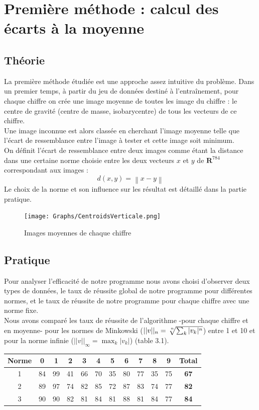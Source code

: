 \documentclass[a4paper,11pt,twoside]{report}
\newcommand{\norm}[1]{\left\lVert#1\right\rVert} %
\begin{document}
\chapter{Première méthode : calcul des écarts à la moyenne} 
\section{Théorie}
La première méthode étudiée est une approche assez intuitive du problème.
Dans un premier temps, à partir du jeu de données destiné à l'entraînement, pour chaque chiffre on crée une image moyenne de toutes les image du chiffre : le centre de gravité (centre de masse, isobarycentre) de tous les vecteurs de ce chiffre.\\Une image inconnue est alors classée en cherchant l'image moyenne telle que l'écart de ressemblance entre l'image à tester et cette image soit minimum.\\

On définit l'écart de ressemblance entre deux images comme étant la distance dans une certaine norme choisie entre les deux vecteurs $x$ et $y$ de $\textbf{R}^{784}$ correspondant aux images : $$d(x,y) = \norm{x-y}$$ Le choix de la norme et son influence sur les résultat est détaillé dans la partie pratique.

\begin{figure}[H]
  	\texttt{[image: Graphs/CentroidsVerticale.png]}
  	\caption{Images moyennes de chaque chiffre}
\end{figure}

\section{Pratique}
Pour analyser l'efficacité de notre programme nous avons choisi d'observer deux types de données, le taux de réussite global de notre programme pour différentes normes, et le taux de réussite de notre programme pour chaque chiffre avec une norme fixe.
\\
Nous avons comparé les taux de réussite de l'algorithme -pour chaque chiffre et en moyenne- pour les normes de Minkowski ($||v||_{n} = \sqrt[\leftroot{-2}\uproot{2} n]{\sum_{k}^{} |v_{k}|^n}$) entre 1 et 10 et pour la norme infinie ($||v||_{\infty} = \displaystyle \max_{k}|v_{k}|$) (table 3.1).

\begin{center}
\begin{tabular}{ |c||c|c|c|c|c|c|c|c|c|c|c| } 
\hline
 Norme & 0 & 1 & 2 & 3 & 4 & 5 & 6 & 7 & 8 & 9 & \textbf{Total} \\ 
  \hline
  \hline
 1 & 84 & 99 & 41 & 66 & 70 & 35 & 80 & 77 & 35 & 75 & \textbf{67}\\
 \hline
 2 & 89 & 97 & 74 & 82 & 85 & 72 & 87 & 83 & 74 & 77 & \textbf{82}\\
 \hline
 3 & 90 & 90 & 82 & 81 & 84 & 81 & 88 & 81 & 84 & 77 & \textbf{84}\\
 \hline
\end{tabular}
\end{center}
\end{document}
